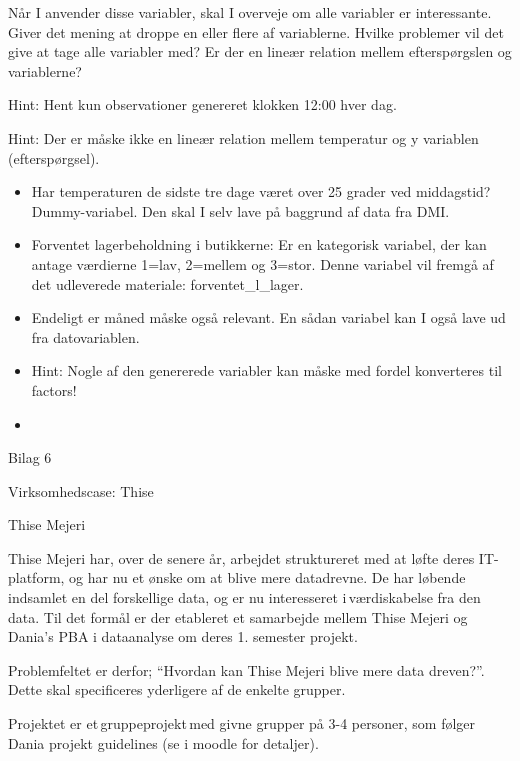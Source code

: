 \documentclass[
  12pt,
  a4paper,
  DIV=11,
  numbers=noendperiod]{scrartcl}
\providecommand{\tightlist}{%
  \setlength{\itemsep}{0pt}\setlength{\parskip}{0pt}}\usepackage{longtable,booktabs,array}
\begin{document}
\begin{itemize}
  Når I anvender disse variabler, skal I overveje om alle variabler er
  interessante. Giver det mening at droppe en eller flere af
  variablerne. Hvilke problemer vil det give at tage alle variabler med?
  Er der en lineær relation mellem efterspørgslen og variablerne?~

  Hint: Hent kun observationer genereret klokken 12:00 hver dag.~

  Hint: Der er måske ikke en lineær relation mellem temperatur og y
  variablen (efterspørgsel).~

  \begin{itemize}
  \tightlist
  \item
    Har temperaturen de sidste tre dage været over 25 grader ved
    middagstid? Dummy-variabel. Den skal I selv lave på baggrund af data
    fra DMI.~~
  \end{itemize}

  \begin{itemize}
  \item
    Forventet lagerbeholdning i butikkerne: Er en kategorisk variabel,
    der kan antage værdierne 1=lav, 2=mellem og 3=stor. Denne variabel
    vil fremgå af det udleverede materiale: forventet\_l\_lager.~
  \item
    Endeligt er måned måske også relevant. En sådan variabel kan I også
    lave ud fra datovariablen.~
  \item
    Hint: Nogle af den genererede variabler kan måske med fordel
    konverteres til factors!~
  \item
  \end{itemize}

  Bilag 6~

  Virksomhedscase: Thise~

  Thise Mejeri~

  Thise Mejeri har, over de senere år, arbejdet struktureret med at
  løfte deres IT-platform, og har nu et ønske om at blive mere
  datadrevne. De har løbende indsamlet en del forskellige data, og er nu
  interesseret i\,værdiskabelse fra den data. Til det formål er der
  etableret et samarbejde mellem Thise Mejeri og Dania's PBA i
  dataanalyse om deres 1. semester projekt.~

  Problemfeltet er derfor; ``Hvordan kan Thise Mejeri blive mere data
  dreven?''. Dette skal specificeres yderligere af de enkelte grupper.~

  Projektet er et\,gruppeprojekt\,med givne grupper på 3-4 personer, som
  følger Dania projekt guidelines (se i moodle for detaljer).~


\end{itemize}
\end{document}
